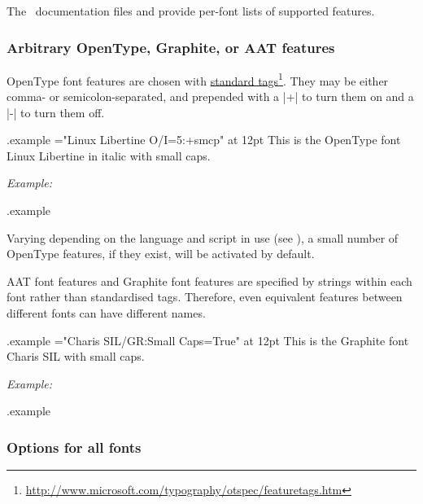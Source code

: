 \documentclass[12pt]{article}
\edef\examplefilename{\jobname.example}
\newlength\exampleindent
\newenvironment{example}
  {\VerbatimEnvironment
   \begin{VerbatimOut}{\examplefilename}}
  {\end{VerbatimOut}
   \typesetexample}
\newcommand\typesetexample{%
  \begin{trivlist}\item[]
  \vrule
  \hspace{\exampleindent}
  \begin{minipage}{\linewidth-\exampleindent-\exampleindent}
    \textit{Example:}\par
    \vspace{0.4\baselineskip}
    \BVerbatimInput[fontsize=\small]{\examplefilename}\par
    \vspace{0.4\baselineskip}
    \color[rgb]{0.7,0,0}\examplefilename\relax
  \end{minipage}\par
  \end{trivlist}}
\newcommand\hlink[2]{\href{#1}{#2}\footnote{\url{#1}}}
\begin{document}
The \XeTeX\ documentation files  and
 provide per-font lists of supported features.

\subsubsection{Arbitrary OpenType, Graphite, or AAT features}

OpenType font features are chosen with
\hlink{http://www.microsoft.com/typography/otspec/featuretags.htm}{standard
tags}. They may be either comma- or semicolon-separated, and prepended
with a |+| to turn them on and a |-| to turn them off.

\begin{example}
\font\liber="Linux Libertine O/I=5:+smcp" at 12pt
\liber This is the OpenType font Linux Libertine in italic with small caps.
\end{example}

Varying depending on the language and script in use (see
), a small number of OpenType features, if they
exist, will be activated by default.

AAT font features and Graphite font features are specified by strings
within each font rather than standardised tags. Therefore, even
equivalent features between different fonts can have different names.

\begin{example}
\font\gra="Charis SIL/GR:Small Caps=True" at 12pt
\gra This is the Graphite font Charis SIL with small caps.
\end{example}

\subsubsection{Options for all fonts}
\end{document}
